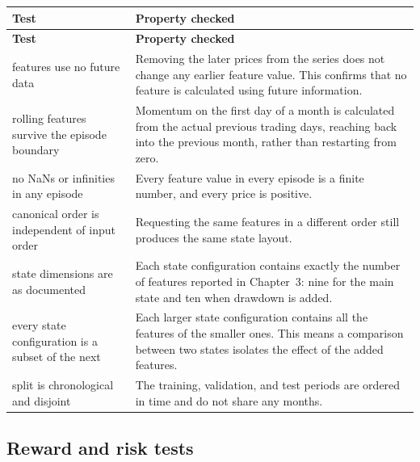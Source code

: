 \begin{longtable}{@{}p{}p{}@{}}
\toprule
\textbf{Test} & \textbf{Property checked} \\
\midrule
\endfirsthead
\toprule
\textbf{Test} & \textbf{Property checked} \\
\midrule
\endhead
\bottomrule
\endlastfoot
features use no future data & Removing the later prices from the series
  does not change any earlier feature value. This confirms that no
  feature is calculated using future information. \\
\rowsep
rolling features survive the episode boundary & Momentum on the first
  day of a month is calculated from the actual previous trading days,
  reaching back into the previous month, rather than restarting from
  zero. \\
\rowsep
no NaNs or infinities in any episode & Every feature value in every
  episode is a finite number, and every price is positive. \\
\rowsep
canonical order is independent of input order & Requesting the same
  features in a different order still produces the same state layout. \\
\rowsep
state dimensions are as documented & Each state configuration contains
  exactly the number of features reported in Chapter~3: nine for the
  main state and ten when drawdown is added. \\
\rowsep
every state configuration is a subset of the next & Each larger state
  configuration contains all the features of the smaller ones. This means
  a comparison between two states isolates the effect of the added
  features. \\
\rowsep
split is chronological and disjoint & The training, validation, and test
  periods are ordered in time and do not share any months. \\
\end{longtable}

\subsection*{Reward and risk tests}


